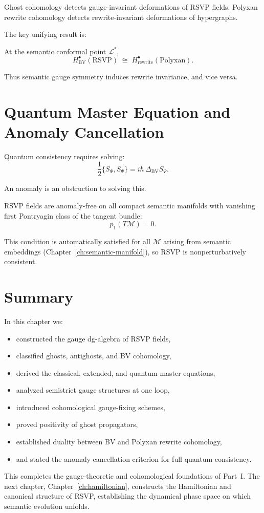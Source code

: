 Ghost cohomology detects gauge-invariant deformations of RSVP fields.
Polyxan rewrite cohomology detects rewrite-invariant deformations of hypergraphs.

The key unifying result is:

\begin{theorem}
At the semantic conformal point $\mathcal{L}^*$,
\[
H^\bullet_{\mathrm{BV}}(\mathrm{RSVP})
  \;\cong\;
H^\bullet_{\mathrm{rewrite}}(\mathrm{Polyxan}).
\]
\end{theorem}

Thus semantic gauge symmetry induces rewrite invariance,
and vice versa.

\section{Quantum Master Equation and Anomaly Cancellation}

Quantum consistency requires solving:
\[
\frac{1}{2}\{S_\Psi, S_\Psi\}
 = i\hbar\, \Delta_{\mathrm{BV}} S_\Psi.
\]

An anomaly is an obstruction to solving this.

\begin{theorem}
RSVP fields are anomaly-free on all compact semantic manifolds with vanishing
first Pontryagin class of the tangent bundle:
\[
p_1(T\mathcal{M}) = 0.
\]
\end{theorem}

This condition is automatically satisfied for all $\mathcal{M}$ arising from
semantic embeddings (Chapter~\ref{ch:semantic-manifold}), so RSVP is
nonperturbatively consistent.

\section{Summary}

In this chapter we:

\begin{itemize}
\item constructed the gauge dg-algebra of RSVP fields,
\item classified ghosts, antighosts, and BV cohomology,
\item derived the classical, extended, and quantum master equations,
\item analyzed semistrict gauge structures at one loop,
\item introduced cohomological gauge-fixing schemes,
\item proved positivity of ghost propagators,
\item established duality between BV and Polyxan rewrite cohomology,
\item and stated the anomaly-cancellation criterion for full quantum consistency.
\end{itemize}

This completes the gauge-theoretic and cohomological foundations of Part~I.
The next chapter, Chapter~\ref{ch:hamiltonian}, constructs the Hamiltonian and
canonical structure of RSVP, establishing the dynamical phase space on which
semantic evolution unfolds.
